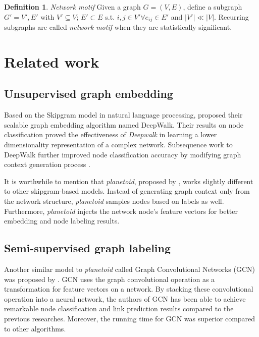 \documentclass{article}
\theoremstyle{definition}
\newtheorem{definition}{Definition}[section]
\begin{document}
\begin{definition}{\emph{Network motif}}
Given a graph $G = (V,E)$, define a subgraph $G' = {V', E'}$ with $V' \subseteq V$;
$E' \subset E$ s.t. $i,j \in V' \forall e_{ij} \in E'$ and $|V'| \ll |V|$. Recurring subgraphs
are called \emph{network motif} when they are statistically significant.
\end{definition}

\section{Related work}

\subsection{Unsupervised graph embedding}

Based on the Skipgram model \cite{skipgram} in natural language 
processing, \citeauthor{Deepwalk} proposed their
scalable graph embedding algorithm named DeepWalk. Their results on node 
classification proved the effectiveness of \emph{Deepwalk} in learning a 
lower dimensionality representation of a complex network. Subsequence 
work to DeepWalk further improved node classification accuracy by 
modifying graph context generation process
\cite{line,grarep,planetoid,node2vec}. 

It is worthwhile to mention that \emph{planetoid}, proposed by 
\citeauthor{planetoid}, works slightly different to other skipgram-based 
models. Instead of generating graph context only from the network 
structure, \emph{planetoid} samples nodes based on labels as well. 
Furthermore, \emph{planetoid} injects the network
node's feature vectors for better embedding and node labeling results.

\subsection{Semi-supervised graph labeling}

Another similar model to \emph{planetoid} called Graph Convolutional 
Networks (GCN) 
was proposed by \citeauthor{gcn}. GCN uses the graph convolutional
operation as a transformation for feature vectors on a network. By stacking
these convolutional operation into a neural network, the authors of
GCN has been able to achieve remarkable node classification and link
prediction results compared to the previous researches. Moreover, the
running time for GCN was superior compared to other algorithms.
\end{document}
